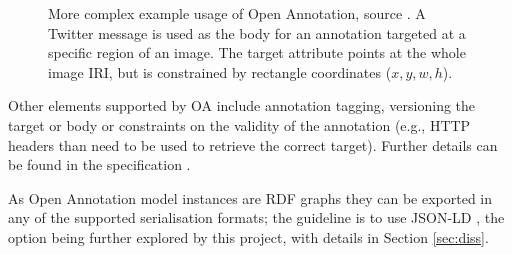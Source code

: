 \begin{figure}[!ht]
  \centering
  \caption[Twitter message used to annotate an image region using Open Annotation.]
          {More complex example usage of Open Annotation, source \cite{ref:oahubble}.
           A Twitter message is used as the body for an annotation targeted at a
           specific region of an image. The target attribute points at the whole
           image IRI, but is constrained by rectangle coordinates
           ($x, y, w, h$).}
  \label{fig:oahubble}
\end{figure}

Other elements supported by OA include annotation tagging, versioning the
target or body or constraints on the validity of the annotation (e.g., HTTP
headers than need to be used to retrieve the correct target). Further details
can be found in the specification \cite{ref:oa}.

As Open Annotation model instances are RDF graphs they can be exported in any
of the supported serialisation formats; the guideline is to use JSON-LD
\cite{ref:oa}, the option being further explored by this project, with details
in Section \ref{sec:diss}.
